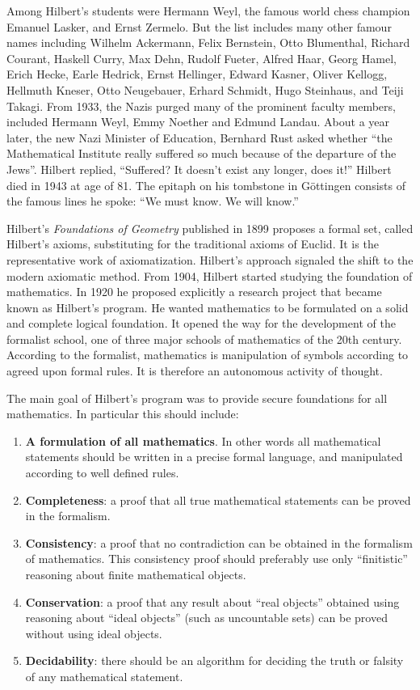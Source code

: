 \documentclass{article}
\begin{document}
Among Hilbert's students were Hermann Weyl, the famous world chess champion Emanuel Lasker, and Ernst Zermelo. But the list includes many other famour names including Wilhelm Ackermann, Felix Bernstein, Otto Blumenthal, Richard Courant, Haskell Curry, Max Dehn, Rudolf Fueter, Alfred Haar, Georg Hamel, Erich Hecke, Earle Hedrick, Ernst Hellinger, Edward Kasner, Oliver Kellogg, Hellmuth Kneser, Otto Neugebauer, Erhard Schmidt, Hugo Steinhaus, and Teiji Takagi. From 1933, the Nazis purged many of the prominent faculty members, included Hermann Weyl, Emmy Noether and Edmund Landau. About a year later, the new Nazi Minister of Education, Bernhard Rust asked whether ``the Mathematical Institute really suffered so much because of the departure of the Jews''. Hilbert replied, ``Suffered? It doesn't exist any longer, does it!'' Hilbert died in 1943 at age of 81. The epitaph on his tombstone in Göttingen consists of the famous lines he spoke: ``We must know. We will know.''

Hilbert's {\em Foundations of Geometry} published in 1899 proposes a formal set, called Hilbert's axioms, substituting for the traditional axioms of Euclid. It is the representative work of axiomatization. Hilbert's approach signaled the shift to the modern axiomatic method. From 1904, Hilbert started studying the foundation of mathematics. In 1920 he proposed explicitly a research project that became known as Hilbert's program. He wanted mathematics to be formulated on a solid and complete logical foundation. It opened the way for the development of the formalist school, one of three major schools of mathematics of the 20th century. According to the formalist, mathematics is manipulation of symbols according to agreed upon formal rules. It is therefore an autonomous activity of thought.

The main goal of Hilbert's program was to provide secure foundations for all mathematics. In particular this should include:

\begin{enumerate}
\item \textbf{A formulation of all mathematics}. In other words all mathematical statements should be written in a precise formal language, and manipulated according to well defined rules.

\item \textbf{Completeness}: a proof that all true mathematical statements can be proved in the formalism.
\item \textbf{Consistency}: a proof that no contradiction can be obtained in the formalism of mathematics. This consistency proof should preferably use only ``finitistic'' reasoning about finite mathematical objects.
\item \textbf{Conservation}: a proof that any result about ``real objects'' obtained using reasoning about ``ideal objects'' (such as uncountable sets) can be proved without using ideal objects.
\item \textbf{Decidability}: there should be an algorithm for deciding the truth or falsity of any mathematical statement.
\end{enumerate}
\end{document}

